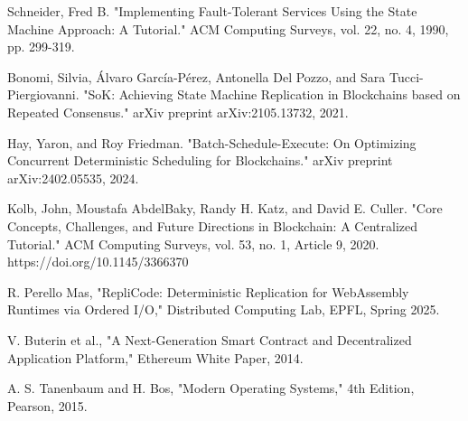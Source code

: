 \documentclass[10pt,a4paper,twocolumn]{IEEEtran}
\begin{document}
\begin{thebibliography}{99}
 Schneider, Fred B. "Implementing Fault-Tolerant Services Using the State Machine Approach: A Tutorial." ACM Computing Surveys, vol. 22, no. 4, 1990, pp. 299-319.

 Bonomi, Silvia, Álvaro García-Pérez, Antonella Del Pozzo, and Sara Tucci-Piergiovanni. "SoK: Achieving State Machine Replication in Blockchains based on Repeated Consensus." arXiv preprint arXiv:2105.13732, 2021.

 Hay, Yaron, and Roy Friedman. "Batch-Schedule-Execute: On Optimizing Concurrent Deterministic Scheduling for Blockchains." arXiv preprint arXiv:2402.05535, 2024.

 Kolb, John, Moustafa AbdelBaky, Randy H. Katz, and David E. Culler. "Core Concepts, Challenges, and Future Directions in Blockchain: A Centralized Tutorial." ACM Computing Surveys, vol. 53, no. 1, Article 9, 2020. https://doi.org/10.1145/3366370

 R. Perello Mas, "RepliCode: Deterministic Replication for WebAssembly Runtimes via Ordered I/O," Distributed Computing Lab, EPFL, Spring 2025.

 V. Buterin et al., "A Next-Generation Smart Contract and Decentralized Application Platform," Ethereum White Paper, 2014.

 A. S. Tanenbaum and H. Bos, "Modern Operating Systems," 4th Edition, Pearson, 2015.

\end{thebibliography}
\end{document}
